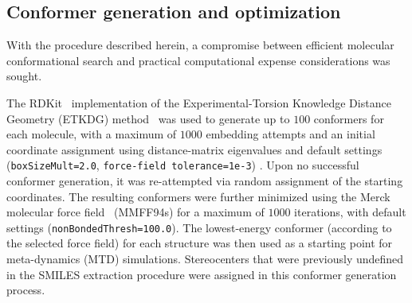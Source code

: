 \subsection*{Conformer generation and optimization}

With the procedure described herein, a compromise between efficient molecular conformational search and practical computational expense considerations was sought. 

The RDKit~\cite{rdkit} implementation of the Experimental-Torsion Knowledge Distance Geometry (ETKDG) method~\cite{riniker2015better} was used to generate up to $100$ conformers for each molecule, with a maximum of $1000$ embedding attempts and an initial coordinate assignment using distance-matrix eigenvalues and default settings (\texttt{boxSizeMult=2.0}, \texttt{force-field tolerance=1e-3}) . Upon no successful conformer generation, it was re-attempted via random assignment of the starting coordinates. The resulting conformers were further minimized using the Merck molecular force field~\cite{tosco2014bringing} (MMFF94s) for a maximum of $1000$ iterations, with default settings (\texttt{nonBondedThresh=100.0}). The lowest-energy conformer (according to the selected force field) for each structure was then used as a starting point for meta-dynamics (MTD) simulations. Stereocenters that were previously undefined in the SMILES extraction procedure were assigned in this conformer generation process. 


